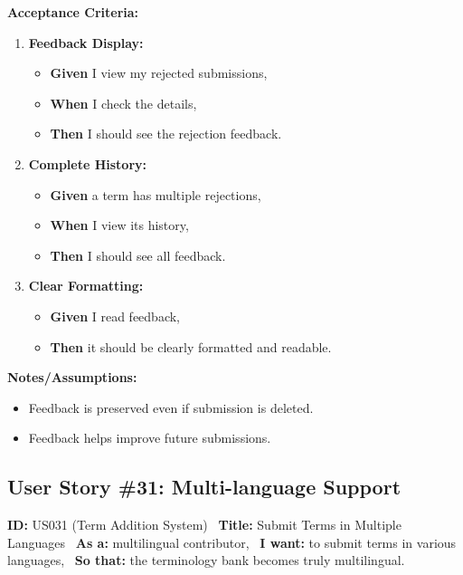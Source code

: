 \documentclass[12pt]{article}
\begin{document}
\vspace{1em}
\textbf{Acceptance Criteria:}
\begin{enumerate}
\item \textbf{Feedback Display:}
\begin{itemize}
\item \textbf{Given} I view my rejected submissions,
\item \textbf{When} I check the details,
\item \textbf{Then} I should see the rejection feedback.
\end{itemize}

\item \textbf{Complete History:}
\begin{itemize}
    \item \textbf{Given} a term has multiple rejections,
    \item \textbf{When} I view its history,
    \item \textbf{Then} I should see all feedback.
\end{itemize}

\item \textbf{Clear Formatting:}
\begin{itemize}
    \item \textbf{Given} I read feedback,
    \item \textbf{Then} it should be clearly formatted and readable.
\end{itemize}
\end{enumerate}

\vspace{1em}
\textbf{Notes/Assumptions:}
\begin{itemize}
\item Feedback is preserved even if submission is deleted.
\item Feedback helps improve future submissions.
\end{itemize}

\subsection{User Story \#31: Multi-language Support}
\textbf{ID:} US031 (Term Addition System) \
\textbf{Title:} Submit Terms in Multiple Languages \
\textbf{As a:} multilingual contributor, \
\textbf{I want:} to submit terms in various languages, \
\textbf{So that:} the terminology bank becomes truly multilingual.
\end{document}
